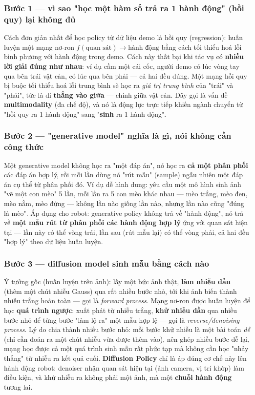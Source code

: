 \documentclass[a4paper,12pt]{article}
\begin{document}
\subsubsection{Bước 1 --- vì sao "học một hàm số trả ra 1 hành động" (hồi quy) lại không đủ}
Cách đơn giản nhất để học policy từ dữ liệu demo là hồi quy (regression): huấn luyện một mạng nơ-ron $f(\text{quan sát}) \to \text{hành động}$ bằng cách tối thiểu hoá lỗi bình phương với hành động trong demo. Cách này thất bại khi tác vụ có \textbf{nhiều lời giải đúng như nhau}: ví dụ cầm một cái cốc, người demo có lúc vòng tay qua bên trái vật cản, có lúc qua bên phải --- cả hai đều đúng. Một mạng hồi quy bị buộc tối thiểu hoá lỗi trung bình sẽ học ra \emph{giá trị trung bình} của "trái" và "phải", tức là đi \textbf{thẳng vào giữa} --- chính giữa vật cản. Đây gọi là vấn đề \textbf{multimodality} (đa chế độ), và nó là động lực trực tiếp khiến ngành chuyển từ "hồi quy ra 1 hành động" sang "\textbf{sinh} ra 1 hành động".

\subsubsection{Bước 2 --- "generative model" nghĩa là gì, nói không cần công thức}
Một generative model không học ra "một đáp án", nó học ra \textbf{cả một phân phối} các đáp án hợp lý, rồi mỗi lần dùng nó "rút mẫu" (sample) ngẫu nhiên một đáp án cụ thể từ phân phối đó. Ví dụ dễ hình dung: yêu cầu một mô hình sinh ảnh "vẽ một con mèo" 5 lần, mỗi lần ra 5 con mèo khác nhau --- mèo trắng, mèo đen, mèo nằm, mèo đứng --- không lần nào giống lần nào, nhưng lần nào cũng "đúng là mèo". Áp dụng cho robot: generative policy không trả về "hành động", nó trả về \textbf{một mẫu rút từ phân phối các hành động hợp lý} ứng với quan sát hiện tại --- lần này có thể vòng trái, lần sau (rút mẫu lại) có thể vòng phải, cả hai đều "hợp lý" theo dữ liệu huấn luyện.

\subsubsection{Bước 3 --- diffusion model sinh mẫu bằng cách nào}
Ý tưởng gốc (huấn luyện trên ảnh): lấy một bức ảnh thật, \textbf{làm nhiễu dần} (thêm một chút nhiễu Gauss) qua rất nhiều bước nhỏ, tới khi ảnh biến thành nhiễu trắng hoàn toàn --- gọi là \emph{forward process}. Mạng nơ-ron được huấn luyện để học \textbf{quá trình ngược}: xuất phát từ nhiễu trắng, \textbf{khử nhiễu dần} qua nhiều bước nhỏ để từng bước "làm lộ ra" một mẫu hợp lệ --- gọi là \emph{reverse/denoising process}. Lý do chia thành nhiều bước nhỏ: mỗi bước khử nhiễu là một bài toán \emph{dễ} (chỉ cần đoán ra một chút nhiễu vừa được thêm vào), nên ghép nhiều bước dễ lại, mạng học được cả một quá trình sinh mẫu rất phức tạp mà không cần học "nhảy thẳng" từ nhiễu ra kết quả cuối. \textbf{Diffusion Policy} chỉ là áp đúng cơ chế này lên hành động robot: denoiser nhận quan sát hiện tại (ảnh camera, vị trí khớp) làm điều kiện, và khử nhiễu ra không phải một ảnh, mà một \textbf{chuỗi hành động} tương lai.
\end{document}

